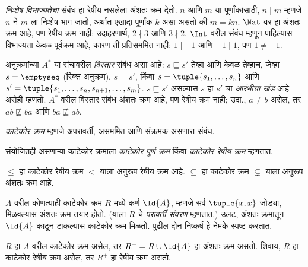 \documentclass[../../../include/open-logic-section]{subfiles}
\begin{document}
\begin{ex}
\emph{निःशेष विभाज्यतेचा} संबंध हा रेषीय नसलेला अंशतः क्रम देतो.
$n$ आणि $m$ या पूर्णांकांसाठी, $n \mid m$ म्हणजे $n$ ने $m$ ला निःशेष
भाग जातो, अर्थात एखादा पूर्णांक $k$ असा असतो की $m = kn$.
$\Nat$ वर हा अंशतः क्रम आहे, पण रेषीय क्रम नाही: उदाहरणार्थ,
$2 \nmid 3$ आणि $3 \nmid 2$. $\Int$ वरील संबंध म्हणून पाहिल्यास
विभाज्यता केवळ पूर्वक्रम आहे, कारण ती प्रतिसममित नाही:
$1 \mid -1$ आणि $-1 \mid 1$, पण $1 \neq -1$.
\end{ex}

\begin{ex}
अनुक्रमांच्या $A^*$ या संचावरील \emph{विस्तार} संबंध असा आहे:
$s \sqsubseteq s'$ तेव्हा आणि केवळ तेव्हाच, जेव्हा $s = \emptyseq$
(रिक्त अनुक्रम), $s = s'$, किंवा $s = \tuple{s_1, \dots, s_n}$ आणि
$s' = \tuple{s_1, \dots, s_n, s_{n+1}, \dots, s_m}$.
$s \sqsubseteq s'$ असल्यास $s$ हा $s'$ चा \emph{आरंभीचा खंड} आहे असेही
म्हणतो. $A^*$ वरील विस्तार संबंध अंशतः क्रम आहे, पण रेषीय क्रम नाही;
उदा., $a \neq b$ असेल, तर $ab \not\sqsubseteq ba$ आणि
$ba \not\sqsubseteq ab$.
\end{ex}

\begin{defn}[काटेकोर क्रम]
\emph{काटेकोर क्रम} म्हणजे अपरावर्ती, असममित आणि संक्रमक असणारा संबंध.
\end{defn}

\begin{defn}[काटेकोर रेषीय क्रम]
संयोजितही असणाऱ्या काटेकोर क्रमाला \emph{काटेकोर पूर्ण क्रम} किंवा
\emph{काटेकोर रेषीय क्रम} म्हणतात.
\end{defn}

\begin{ex}
$\le$ हा काटेकोर रेषीय क्रम $<$ याला अनुरूप रेषीय क्रम आहे.
$\subseteq$ हा काटेकोर क्रम $\subsetneq$ याला अनुरूप अंशतः क्रम आहे.
\end{ex}

$A$ वरील कोणत्याही काटेकोर क्रम $R$ मध्ये कर्ण $\Id{A}$, म्हणजे सर्व
$\tuple{x, x}$ जोड्या, मिळवल्यास अंशतः क्रम तयार होतो. (याला $R$ चे
\emph{परावर्ती संवरण} म्हणतात.) उलट, अंशतः क्रमातून $\Id{A}$ काढून
टाकल्यास काटेकोर क्रम मिळतो. पुढील दोन निष्कर्ष हे नेमके स्पष्ट करतात.

\begin{prop}
$R$ हा $A$ वरील काटेकोर क्रम असेल, तर $R^+ = R \cup \Id{A}$ हा अंशतः
क्रम असतो. शिवाय, $R$ हा काटेकोर रेषीय क्रम असेल, तर $R^+$ हा रेषीय
क्रम असतो.
\end{prop}
\end{document}
